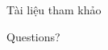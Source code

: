 \documentclass[10pt]{beamer}
\newcommand{\themename}{\textbf{\textsc{metropolis}}\xspace}
\begin{document}






\begin{frame}[allowframebreaks]{Tài liệu tham khảo}
  
  
\end{frame}

\begin{frame}[standout]
  Questions?
\end{frame}
\end{document}
